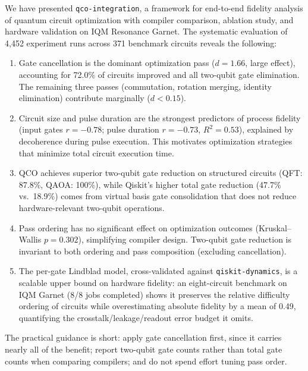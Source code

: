 \documentclass[sigconf,nonacm]{acmart}
\begin{document}
We have presented \texttt{qco-integration}, a framework for end-to-end fidelity analysis of quantum circuit optimization with compiler comparison, ablation study, and hardware validation on IQM Resonance Garnet. The systematic evaluation of 4{,}452 experiment runs across 371 benchmark circuits reveals the following:

\begin{enumerate}
    \item Gate cancellation is the dominant optimization pass ($d = 1.66$, large effect), accounting for 72.0\% of circuits improved and all two-qubit gate elimination. The remaining three passes (commutation, rotation merging, identity elimination) contribute marginally ($d < 0.15$).

    \item Circuit size and pulse duration are the strongest predictors of process fidelity (input gates $r = -0.78$; pulse duration $r = -0.73$, $R^2 = 0.53$), explained by decoherence during pulse execution. This motivates optimization strategies that minimize total circuit execution time.

    \item QCO achieves superior two-qubit gate reduction on structured circuits (QFT: 87.8\%, QAOA: 100\%), while Qiskit's higher total gate reduction (47.7\% vs.\ 18.9\%) comes from virtual basis gate consolidation that does not reduce hardware-relevant two-qubit operations.

    \item Pass ordering has no significant effect on optimization outcomes (Kruskal--Wallis $p = 0.302$), simplifying compiler design. Two-qubit gate reduction is invariant to both ordering and pass composition (excluding cancellation).

    \item The per-gate Lindblad model, cross-validated against \texttt{qiskit-dynamics}, is a scalable upper bound on hardware fidelity: an eight-circuit benchmark on IQM Garnet (8/8 jobs completed) shows it preserves the relative difficulty ordering of circuits while overestimating absolute fidelity by a mean of 0.49, quantifying the crosstalk/leakage/readout error budget it omits.
\end{enumerate}

The practical guidance is short: apply gate cancellation first, since it carries nearly all of the benefit; report two-qubit gate counts rather than total gate counts when comparing compilers; and do not spend effort tuning pass order.
\end{document}
